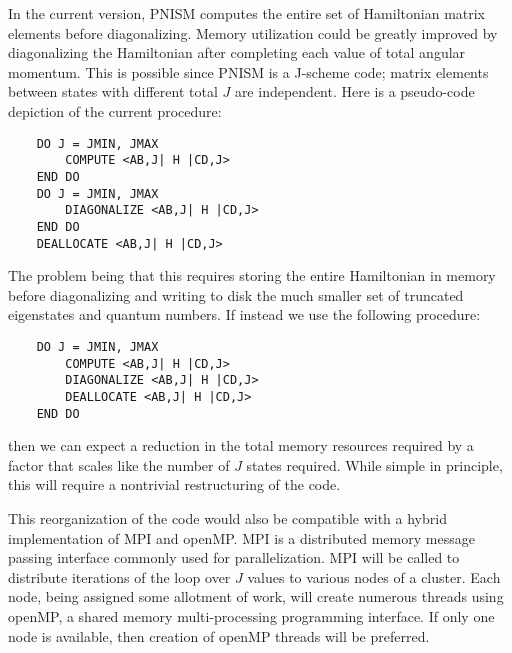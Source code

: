 In the current version, PNISM computes the entire set of Hamiltonian matrix
elements before diagonalizing. Memory utilization could be greatly improved
by diagonalizing the Hamiltonian after completing each value of total angular
momentum. This is possible since PNISM is a J-scheme code; matrix elements between states with
different total $J$ are independent. Here is a pseudo-code depiction of the current
procedure:
\begin{verbatim}
    DO J = JMIN, JMAX
        COMPUTE <AB,J| H |CD,J>
    END DO
    DO J = JMIN, JMAX
        DIAGONALIZE <AB,J| H |CD,J>
    END DO
    DEALLOCATE <AB,J| H |CD,J>
\end{verbatim}
The problem being that this requires storing the entire Hamiltonian in memory
before diagonalizing and writing to disk the much smaller set of truncated 
eigenstates and quantum numbers. If instead we use the following procedure:
\begin{verbatim}
    DO J = JMIN, JMAX
        COMPUTE <AB,J| H |CD,J>
        DIAGONALIZE <AB,J| H |CD,J>
        DEALLOCATE <AB,J| H |CD,J>
    END DO
\end{verbatim}
then we can expect a reduction in the total memory resources required by 
a factor that scales like the number of $J$ states required. While simple 
in principle, this will require a nontrivial restructuring of the 
code.

This reorganization of the code would also be compatible with a hybrid 
implementation of MPI\cite{mpi} and openMP\cite{openmp}. MPI is a 
distributed memory message passing interface commonly used for
parallelization. MPI will be called to distribute iterations
of the loop over $J$ values to various nodes of a cluster.
Each node, being assigned some allotment of work, will 
create numerous threads using openMP, a shared memory
multi-processing programming interface. If only one node is
available, then creation of openMP threads will be preferred.
